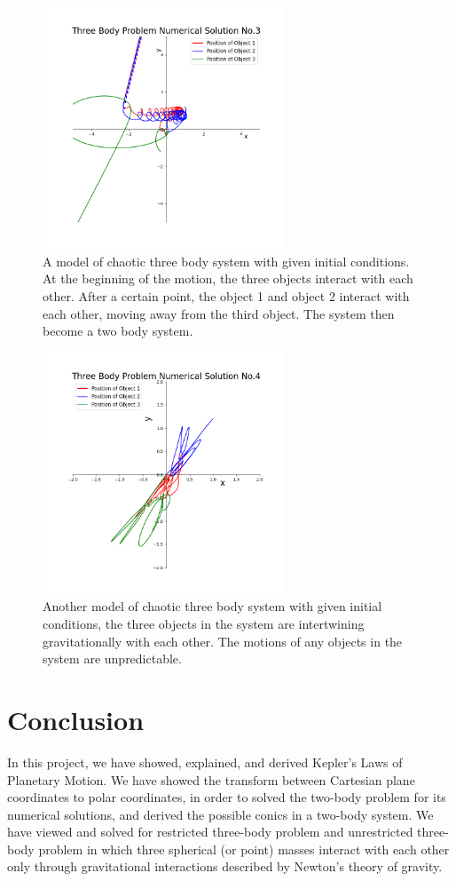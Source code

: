 \begin{figure}
    \includegraphics[width=7.2cm]{Three Body Problem Numerical Solution 3.png}
    \caption{A model of chaotic three body system with given initial conditions. At the beginning of the motion, the three objects interact with each other. After a certain point, the object 1 and object 2 interact with each other, moving away from the third object. The system then become a two body system.}
    \label{Numerical Three Body 2D NO.3}
\end{figure}

\begin{figure}
    \includegraphics[width=7.2cm]{Three Body Problem Numerical Solution 4.png}
    \caption{Another model of chaotic three body system with given initial conditions, the three objects in the system are intertwining gravitationally with each other. The motions of any objects in the system are unpredictable.}
    \label{Numerical Three Body 2D NO.4}
\end{figure}


\section{Conclusion}
In this project, we have showed, explained, and derived Kepler's Laws of Planetary Motion. We have showed the transform between Cartesian plane coordinates to polar coordinates, in order to solved the two-body problem for its numerical solutions, and derived the possible conics in a two-body system. We have viewed and solved for restricted three-body problem and unrestricted three-body problem in which three spherical (or point) masses interact with each other only through gravitational interactions described by Newton’s theory of gravity. 


